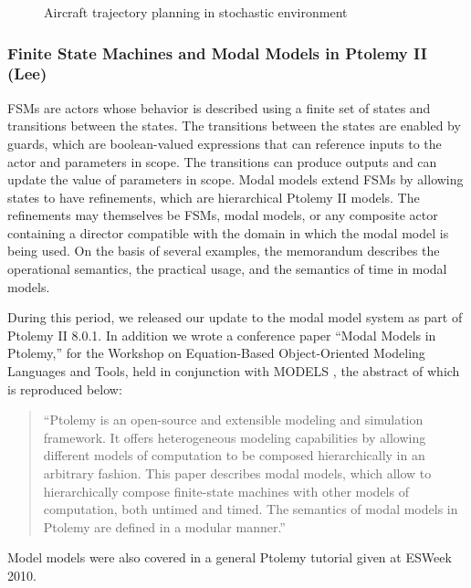 \begin{figure}
\begin{center}
\begin{subfigmatrix}{2}
                     \end{subfigmatrix}
                     \caption{Aircraft trajectory planning in stochastic environment}
                     \label{fig:prob_decoupled}
                   \end{center}
                 \end{figure}




               \subsubsection{Finite State Machines and Modal Models in Ptolemy II (Lee)}


               FSMs are actors whose behavior is described using a
               finite set of states and transitions between the
               states. The transitions between the states are enabled
               by guards, which are boolean-valued expressions that
               can reference inputs to the actor and parameters in
               scope. The transitions can produce outputs and can
               update the value of parameters in scope. Modal models
               extend FSMs by allowing states to have refinements,
               which are hierarchical Ptolemy II models. The
               refinements may themselves be FSMs, modal models, or
               any composite actor containing a director compatible
               with the domain in which the modal model is being
               used. On the basis of several examples, the memorandum
               describes the operational semantics, the practical
               usage, and the semantics of time in modal models.

               During this period, we released our update to the modal model system
               as part of Ptolemy II 8.0.1.  In addition we wrote a conference
               paper ``Modal Models in Ptolemy,''
               for the   Workshop on  Equation-Based Object-Oriented Modeling Languages and Tools,
               held in conjunction with MODELS
               \cite{LeeTripakis10_ModalModelsInPtolemyProceedings}
               \cite{LeeTripakis10_ModalModelsInPtolemyPresentation}, the
               abstract of which is reproduced below:
               \begin{quotation}
                 ``Ptolemy is an open-source and extensible modeling and simulation
                 framework. It offers heterogeneous modeling capabilities by allowing
                 different models of computation to be composed hierarchically in an
                 arbitrary fashion. This paper describes modal models, which allow to
                 hierarchically compose finite-state machines with other models of
                 computation, both untimed and timed. The semantics of modal models
                 in Ptolemy are defined in a modular manner.''
               \end{quotation}
               Model models were also covered in a
               general Ptolemy tutorial\cite{BrooksLeeTripakis10_ExploringModelsOfComputationWithPtolemyII}
               given at ESWeek 2010.



